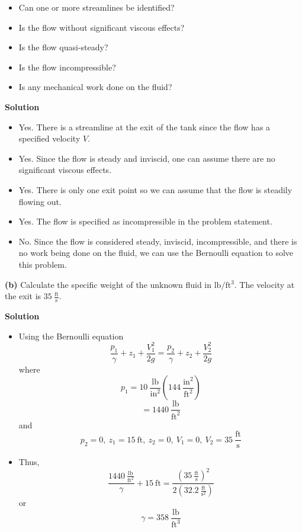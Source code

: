 ﻿\documentclass[12pt]{article}
\begin{document}
\begin{itemize}
    \item[(a)] Can one or more streamlines be identified?
    \item[(b)] Is the flow without significant viscous effects?
    \item[(c)] Is the flow quasi-steady?
    \item[(d)] Is the flow incompressible?
    \item[(e)] Is any mechanical work done on the fluid?
\end{itemize}

\textbf{Solution}
\begin{itemize}
    \item[(a)] Yes. There is a streamline at the exit of the tank since the flow has a specified velocity $V$.
    \item[(b)] Yes. Since the flow is steady and inviscid, one can assume there are no significant viscous effects.
    \item[(c)] Yes. There is only one exit point so we can assume that the flow is steadily flowing out.
    \item[(d)] Yes. The flow is specified as incompressible in the problem statement.
    \item[(e)] No. Since the flow is considered steady, inviscid, incompressible, and there is no work being done on the fluid, we can use the Bernoulli equation to solve this problem.
\end{itemize}

\textbf{(b)} Calculate the specific weight of the unknown fluid in $\mathrm{lb/ft^3}$. The velocity at the exit is $35\ \frac{\mathrm{ft}}{\mathrm{s}}$.

\textbf{Solution}
\begin{itemize}
    \item Using the Bernoulli equation
    \[\frac{p_1}{\gamma}+z_1+\frac{V_1^2}{2g}=\frac{p_2}{\gamma}+z_2+\frac{V_2^2}{2g}\]
    where
    \[p_1=10\ \frac{\mathrm{lb}}{\mathrm{in}^2}\left(144\ \frac{\mathrm{in}^2}{\mathrm{ft}^2}\right)\]
    \[=1440\ \frac{\mathrm{lb}}{\mathrm{ft}^2}\]
    and
    \[p_2=0,\ z_1=15\ \mathrm{ft},\ z_2=0,\ V_1=0,\ V_2=35\ \frac{\mathrm{ft}}{\mathrm{s}}\]
    \item Thus,
    \[\frac{1440\ \frac{\mathrm{lb}}{\mathrm{ft}^2}}{\gamma}+15\ \mathrm{ft}=\frac{\left(35\ \frac{\mathrm{ft}}{\mathrm{s}}\right)^2}{2\left(32.2\ \frac{\mathrm{ft}}{\mathrm{s}^2}\right)}\]
    or
    \[\boxed{\gamma=358\ \frac{\mathrm{lb}}{\mathrm{ft}^3}}\]
\end{itemize}
\end{document}
